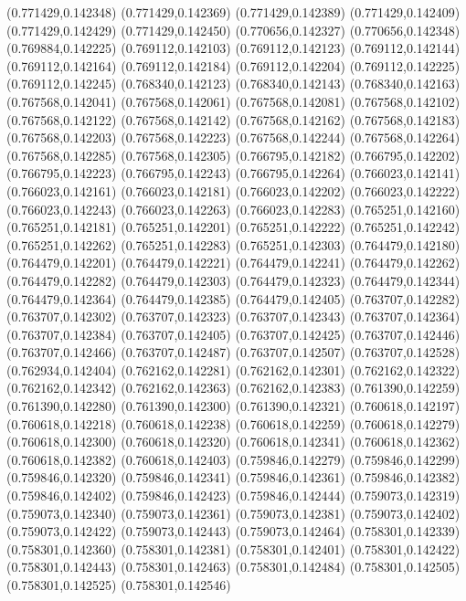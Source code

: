 (0.771429,0.142348)
(0.771429,0.142369)
(0.771429,0.142389)
(0.771429,0.142409)
(0.771429,0.142429)
(0.771429,0.142450)
(0.770656,0.142327)
(0.770656,0.142348)
(0.769884,0.142225)
(0.769112,0.142103)
(0.769112,0.142123)
(0.769112,0.142144)
(0.769112,0.142164)
(0.769112,0.142184)
(0.769112,0.142204)
(0.769112,0.142225)
(0.769112,0.142245)
(0.768340,0.142123)
(0.768340,0.142143)
(0.768340,0.142163)
(0.767568,0.142041)
(0.767568,0.142061)
(0.767568,0.142081)
(0.767568,0.142102)
(0.767568,0.142122)
(0.767568,0.142142)
(0.767568,0.142162)
(0.767568,0.142183)
(0.767568,0.142203)
(0.767568,0.142223)
(0.767568,0.142244)
(0.767568,0.142264)
(0.767568,0.142285)
(0.767568,0.142305)
(0.766795,0.142182)
(0.766795,0.142202)
(0.766795,0.142223)
(0.766795,0.142243)
(0.766795,0.142264)
(0.766023,0.142141)
(0.766023,0.142161)
(0.766023,0.142181)
(0.766023,0.142202)
(0.766023,0.142222)
(0.766023,0.142243)
(0.766023,0.142263)
(0.766023,0.142283)
(0.765251,0.142160)
(0.765251,0.142181)
(0.765251,0.142201)
(0.765251,0.142222)
(0.765251,0.142242)
(0.765251,0.142262)
(0.765251,0.142283)
(0.765251,0.142303)
(0.764479,0.142180)
(0.764479,0.142201)
(0.764479,0.142221)
(0.764479,0.142241)
(0.764479,0.142262)
(0.764479,0.142282)
(0.764479,0.142303)
(0.764479,0.142323)
(0.764479,0.142344)
(0.764479,0.142364)
(0.764479,0.142385)
(0.764479,0.142405)
(0.763707,0.142282)
(0.763707,0.142302)
(0.763707,0.142323)
(0.763707,0.142343)
(0.763707,0.142364)
(0.763707,0.142384)
(0.763707,0.142405)
(0.763707,0.142425)
(0.763707,0.142446)
(0.763707,0.142466)
(0.763707,0.142487)
(0.763707,0.142507)
(0.763707,0.142528)
(0.762934,0.142404)
(0.762162,0.142281)
(0.762162,0.142301)
(0.762162,0.142322)
(0.762162,0.142342)
(0.762162,0.142363)
(0.762162,0.142383)
(0.761390,0.142259)
(0.761390,0.142280)
(0.761390,0.142300)
(0.761390,0.142321)
(0.760618,0.142197)
(0.760618,0.142218)
(0.760618,0.142238)
(0.760618,0.142259)
(0.760618,0.142279)
(0.760618,0.142300)
(0.760618,0.142320)
(0.760618,0.142341)
(0.760618,0.142362)
(0.760618,0.142382)
(0.760618,0.142403)
(0.759846,0.142279)
(0.759846,0.142299)
(0.759846,0.142320)
(0.759846,0.142341)
(0.759846,0.142361)
(0.759846,0.142382)
(0.759846,0.142402)
(0.759846,0.142423)
(0.759846,0.142444)
(0.759073,0.142319)
(0.759073,0.142340)
(0.759073,0.142361)
(0.759073,0.142381)
(0.759073,0.142402)
(0.759073,0.142422)
(0.759073,0.142443)
(0.759073,0.142464)
(0.758301,0.142339)
(0.758301,0.142360)
(0.758301,0.142381)
(0.758301,0.142401)
(0.758301,0.142422)
(0.758301,0.142443)
(0.758301,0.142463)
(0.758301,0.142484)
(0.758301,0.142505)
(0.758301,0.142525)
(0.758301,0.142546)
